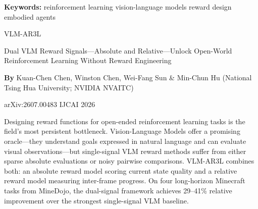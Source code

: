 \documentclass[10pt,twocolumn]{article}
\begin{document}
\setlength{\parindent}{0pt}
\setlength{\parskip}{4pt}

{\small\color{keywordgray}\textbf{Keywords:}
  reinforcement learning \textbullet{}
  vision-language models \textbullet{}
  reward design \textbullet{}
  embodied agents}\par\vspace{4pt}

{\LARGE\bfseries\raggedright
  VLM-AR3L}\par\vspace{4pt}

{\large\itshape\raggedright
  Dual VLM Reward Signals---Absolute and Relative---Unlock
  Open-World Reinforcement Learning Without Reward Engineering}\par\vspace{6pt}

{\small\textbf{By} Kuan-Chen Chen, Winston Chen, Wei-Fang Sun \& Min-Chun Hu
  (National Tsing Hua University; NVIDIA NVAITC)}\par\vspace{2pt}

{\small\color{keywordgray}arXiv:2607.00483 \textbullet{}
  IJCAI 2026}
\par\vspace{2pt}\noindent{\color{rulered}\rule{\columnwidth}{0.6pt}}\vspace{6pt}

Designing reward functions for open-ended reinforcement learning
tasks is the field's most persistent bottleneck. Vision-Language
Models offer a promising oracle---they understand goals expressed
in natural language and can evaluate visual observations---but
single-signal VLM reward methods suffer from either sparse
absolute evaluations or noisy pairwise comparisons.
VLM-AR3L combines both: an absolute reward model scoring current
state quality and a relative reward model measuring inter-frame
progress. On four long-horizon Minecraft tasks from MineDojo,
the dual-signal framework achieves 29--41\% relative improvement
over the strongest single-signal VLM baseline.
\end{document}
